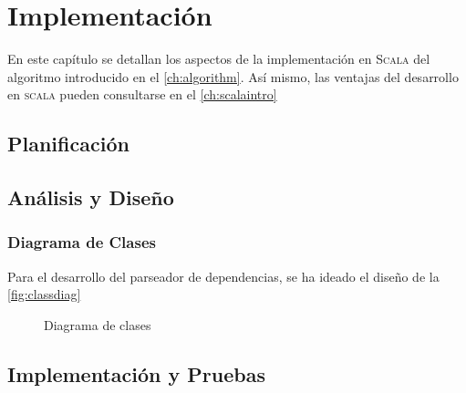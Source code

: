 \chapter{Implementación}
\label{ch:impl}

En este capítulo se detallan los aspectos de la implementación en \textsc{Scala}
del algoritmo introducido en el \autoref{ch:algorithm}. Así mismo, las ventajas
del desarrollo en \textsc{scala} pueden consultarse en el \autoref{ch:scalaintro}

\section{Planificación}
\label{sec:planning}


\section{Análisis y Diseño}
\label{sec:design}


\subsection{Diagrama de Clases}
\label{subsec:classdiagram}

Para el desarrollo del parseador de dependencias, se ha ideado el diseño de la
\autoref{fig:classdiag}
\begin{figure}[ht]
  \centering
  \caption{Diagrama de clases \label{fig:classdiag}}
\end{figure}




\section{Implementación y Pruebas}
\label{sec:impl}



